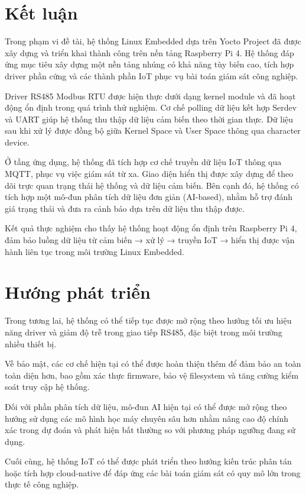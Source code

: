 
\section{Kết luận}

Trong phạm vi đề tài, hệ thống Linux Embedded dựa trên Yocto Project đã được xây dựng và triển khai thành công trên nền tảng Raspberry Pi 4. Hệ thống đáp ứng mục tiêu xây dựng một nền tảng nhúng có khả năng tùy biến cao, tích hợp driver phần cứng và các thành phần IoT phục vụ bài toán giám sát công nghiệp.

Driver RS485 Modbus RTU được hiện thực dưới dạng kernel module và đã hoạt động ổn định trong quá trình thử nghiệm. Cơ chế polling dữ liệu kết hợp Serdev và UART giúp hệ thống thu thập dữ liệu cảm biến theo thời gian thực. Dữ liệu sau khi xử lý được đồng bộ giữa Kernel Space và User Space thông qua character device.

Ở tầng ứng dụng, hệ thống đã tích hợp cơ chế truyền dữ liệu IoT thông qua MQTT, phục vụ việc giám sát từ xa. Giao diện hiển thị được xây dựng để theo dõi trực quan trạng thái hệ thống và dữ liệu cảm biến. Bên cạnh đó, hệ thống có tích hợp một mô-đun phân tích dữ liệu đơn giản (AI-based), nhằm hỗ trợ đánh giá trạng thái và đưa ra cảnh báo dựa trên dữ liệu thu thập được.

Kết quả thực nghiệm cho thấy hệ thống hoạt động ổn định trên Raspberry Pi 4, đảm bảo luồng dữ liệu từ cảm biến → xử lý → truyền IoT → hiển thị được vận hành liên tục trong môi trường Linux Embedded.

\section{Hướng phát triển}

Trong tương lai, hệ thống có thể tiếp tục được mở rộng theo hướng tối ưu hiệu năng driver và giảm độ trễ trong giao tiếp RS485, đặc biệt trong môi trường nhiều thiết bị.

Về bảo mật, các cơ chế hiện tại có thể được hoàn thiện thêm để đảm bảo an toàn toàn diện hơn, bao gồm xác thực firmware, bảo vệ filesystem và tăng cường kiểm soát truy cập hệ thống.

Đối với phần phân tích dữ liệu, mô-đun AI hiện tại có thể được mở rộng theo hướng sử dụng các mô hình học máy chuyên sâu hơn nhằm nâng cao độ chính xác trong dự đoán và phát hiện bất thường so với phương pháp ngưỡng đang sử dụng.

Cuối cùng, hệ thống IoT có thể được phát triển theo hướng kiến trúc phân tán hoặc tích hợp cloud-native để đáp ứng các bài toán giám sát có quy mô lớn trong thực tế công nghiệp.